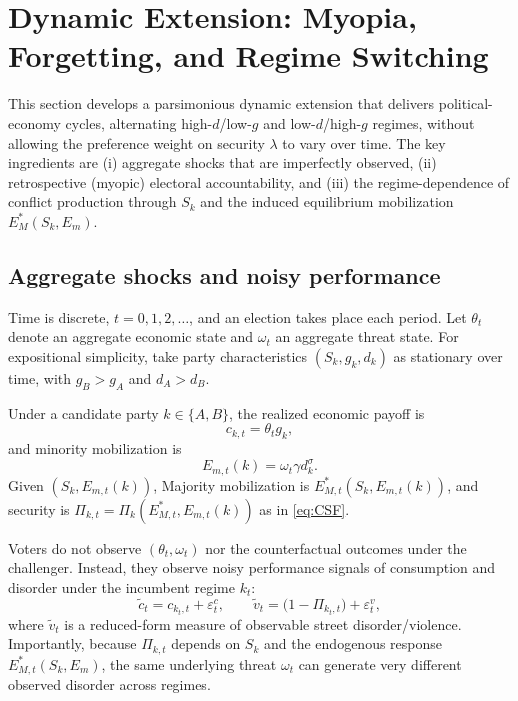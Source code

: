 \documentclass[11pt,twoside]{extarticle}
\begin{document}
\section{Dynamic Extension: Myopia, Forgetting, and Regime Switching} \label{sec:dynamic}

This section develops a parsimonious dynamic extension that delivers political-economy cycles, alternating high-$d$/low-$g$ and low-$d$/high-$g$ regimes, without allowing the preference weight on security $\lambda$ to vary over time. The key ingredients are (i) aggregate shocks that are imperfectly observed, (ii) retrospective (myopic) electoral accountability, and (iii) the regime-dependence of conflict production through $S_k$ and the induced equilibrium mobilization $E_M^*(S_k,E_m)$.

\subsection{Aggregate shocks and noisy performance}
Time is discrete, $t=0,1,2,\dots$, and an election takes place each period. Let $\theta_t$ denote an aggregate economic state and $\omega_t$ an aggregate threat state. For expositional simplicity, take party characteristics $(S_k,g_k,d_k)$ as stationary over time, with $g_B>g_A$ and $d_A>d_B$.

Under a candidate party $k\in\{A,B\}$, the realized economic payoff is
\begin{equation}
c_{k,t} = \theta_t g_k,
\end{equation}
and minority mobilization is
\begin{equation}
E_{m,t}(k)=\omega_t \gamma d_k^{\sigma}.
\end{equation}
Given $(S_k,E_{m,t}(k))$, Majority mobilization is $E_{M,t}^*(S_k,E_{m,t}(k))$, and security is $\Pi_{k,t}=\Pi_k(E_{M,t}^*,E_{m,t}(k))$ as in \autoref{eq:CSF}.

Voters do not observe $(\theta_t,\omega_t)$ nor the counterfactual outcomes under the challenger. Instead, they observe noisy performance signals of consumption and disorder under the incumbent regime $k_t$:
\begin{equation}
\tilde{c}_t = c_{k_t,t} + \varepsilon_t^c, \qquad \tilde{v}_t = \big(1-\Pi_{k_t,t}\big) + \varepsilon_t^v,
\end{equation}
where $\tilde{v}_t$ is a reduced-form measure of observable street disorder/violence. Importantly, because $\Pi_{k,t}$ depends on $S_k$ and the endogenous response $E_{M,t}^*(S_k,E_m)$, the same underlying threat $\omega_t$ can generate very different observed disorder across regimes.
\end{document}

